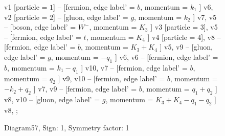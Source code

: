 \documentclass{revtex4}
\begin{document}
\begin{figure}[!htb]
\begin{center}
{    %
v1 [particle = \(1\)] -- [fermion, edge label' = \(b\), momentum = \(k_{1}\) ] v6, 
v2 [particle = \(2\)] -- [gluon, edge label' = \(g\), momentum = \(k_{2}\) ] v7, 
v5 -- [boson, edge label' = \(W^{-}\), momentum = \(K_{3}\) ] v3 [particle = \(3\)], 
v5 -- [fermion, edge label' = \(t\), momentum = \(K_{4}\) ] v4 [particle = \(4\)], 
v8 -- [fermion, edge label' = \(b\), momentum = \(K_{3} + K_{4}\) ] v5, 
v9 -- [gluon, edge label' = \(g\), momentum = \(-q_{1}\) ] v6, 
v6 -- [fermion, edge label' = \(b\), momentum = \(k_{1} - q_{1}\) ] v10, 
v7 -- [fermion, edge label' = \(b\), momentum = \(q_{2}\) ] v9, 
v10 -- [fermion, edge label' = \(b\), momentum = \(-k_{2} + q_{2}\) ] v7, 
v9 -- [fermion, edge label' = \(b\), momentum = \(q_{1} + q_{2}\) ] v8, 
v10 -- [gluon, edge label' = \(g\), momentum = \(K_{3} + K_{4} - q_{1} - q_{2}\) ] v8, 
};
\end{center}
\caption{Diagram57, Sign: 1, Symmetry factor: 1}
\end{figure}
\newpage
\end{document}
